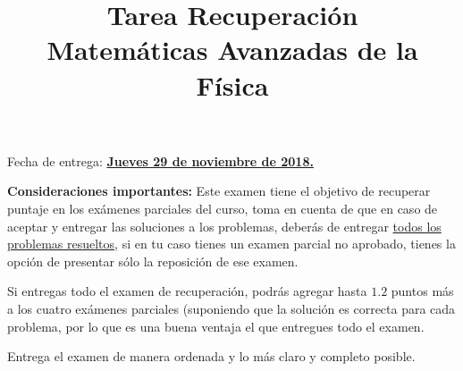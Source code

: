 
\usepackage{standalone}
\usepackage{enumerate}
\usepackage[left=1.5cm,top=1.5cm,right=1.5cm,bottom=1.5cm]{geometry}
\title{Tarea Recuperación \\ \large{Matemáticas Avanzadas de la Física}}
\date{ }

\maketitle
\vspace{-2cm}
Fecha de entrega: \underline{\textbf{Jueves 29 de noviembre de 2018.}}
\par
\textbf{Consideraciones importantes: } Este examen tiene el objetivo de recuperar puntaje en los exámenes parciales del curso, toma en cuenta de que en caso de aceptar y entregar las soluciones a los problemas, deberás de entregar \underline{todos los problemas resueltos}, si en tu caso tienes un examen parcial no aprobado, tienes la opción de presentar sólo la reposición de ese examen.
\par
Si entregas todo el examen de recuperación, podrás agregar hasta $1.2$ puntos más a los cuatro exámenes parciales (suponiendo que la solución es correcta para cada problema, por lo que es una buena ventaja el que entregues todo el examen.
\par
Entrega el examen de manera ordenada y lo más claro y completo posible.

